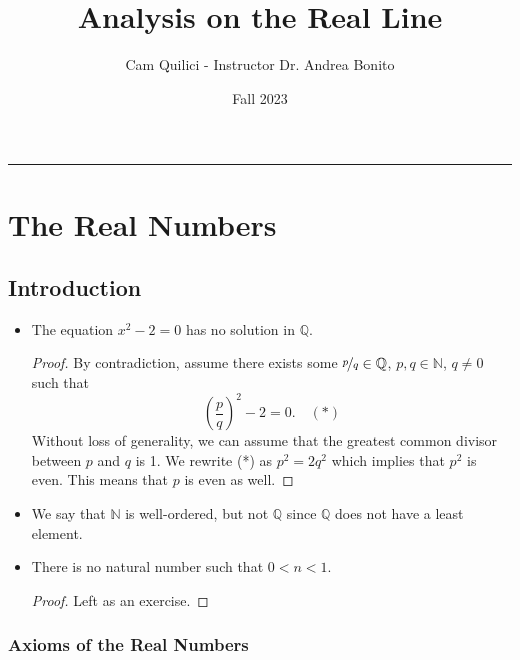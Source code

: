 \documentclass{article}
\title{Analysis on the Real Line}
\author{Cam Quilici - Instructor Dr. Andrea Bonito}
\date{Fall 2023}
\newcommand{\Q}{\mathbb{Q}}
\newcommand{\N}{\mathbb{N}}
\newcommand{\?}{\stackrel{?}{=}}
\theoremstyle{definition} %
\begin{document}
\maketitle

\vspace{-0.3in}
\noindent
\rule{\linewidth}{0.4pt}

\tableofcontents

\newpage

\section{The Real Numbers}

\subsection{Introduction}

\begin{itemize}
    \item[]
    \begin{lemma}
        The equation $x^2 - 2 = 0$ has no solution in $\Q$.
    \end{lemma}
    \begin{proof}
        By contradiction, assume there exists some $\nicefrac{p}{q} \in \Q$, $p, q \in \N$, $q \neq 0$ such that
        $$\left(\frac{p}{q}\right)^2 - 2 = 0. \quad (*)$$
        Without loss of generality, we can assume that the greatest common divisor between $p$ and $q$ is 1. We rewrite (*) as $p^2 = 2q^2$ which implies that $p^2$ is even. This means that $p$ is even as well.
    \end{proof}
    \item We say that $\N$ is well-ordered, but not $\Q$ since $\Q$ does not have a least element.
    \item[]
    \begin{proposition}
        There is no natural number such that $0 < n < 1$.
    \end{proposition}
    \begin{proof}
        Left as an exercise.
    \end{proof}
\end{itemize}

\subsubsection{Axioms of the Real Numbers}
\end{document}
